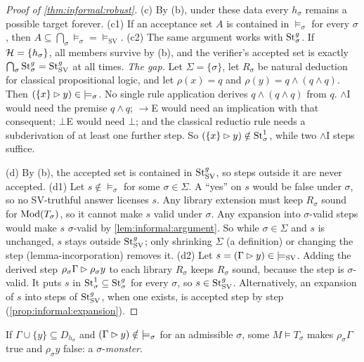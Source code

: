 \begin{proof}[Proof of \cref{thm:informal:robust}]
(c) By (b), under these data every $h_\sigma$ remains a possible target forever. (c1) If an acceptance set $A$ is contained in ${\models_\sigma}$ for every $\sigma$, then $A\subseteq\bigcap_\sigma{\models_\sigma}={\models_{\mathrm{SV}}}$. (c2) The same argument works with $\mathrm{St}^{g}_{\sigma}$. If $\mathcal{H}=\{h_\sigma\}$, all members survive by (b), and the verifier's accepted set is exactly $\bigcap_\sigma\mathrm{St}^{g}_{\sigma}=\mathrm{St}^{g}_{\mathrm{SV}}$ at all times. \emph{The gap.} Let $\Sigma=\{\sigma\}$, let $R_\sigma$ be natural deduction for classical propositional logic, and let $\rho(x)=q$ and $\rho(y)=q\wedge(q\wedge q)$. Then $(\{x\}\rhd y)\in{\models_\sigma}$. No single rule application derives $q\wedge(q\wedge q)$ from $q$. $\wedge$I would need the premise $q\wedge q$; $\to$E would need an implication with that consequent; $\bot$E would need $\bot$; and the classical reductio rule needs a subderivation of at least one further step. So $(\{x\}\rhd y)\notin\mathrm{St}^{1}_{\sigma}$, while two $\wedge$I steps suffice.

(d) By (b), the accepted set is contained in $\mathrm{St}^{g}_{\mathrm{SV}}$, so steps outside it are never accepted.
(d1) Let $s\notin{\models_\sigma}$ for some $\sigma\in\Sigma$. A ``yes'' on $s$ would be false under $\sigma$, so no SV-truthful answer licenses $s$. Any library extension must keep $R_\sigma$ sound for $\mathrm{Mod}(T_\sigma)$, so it cannot make $s$ valid under $\sigma$. Any expansion into $\sigma$-valid steps would make $s$ $\sigma$-valid by \cref{lem:informal:argument}. So while $\sigma\in\Sigma$ and $s$ is unchanged, $s$ stays outside $\mathrm{St}^{g}_{\mathrm{SV}}$; only shrinking $\Sigma$ (a definition) or changing the step (lemma-incorporation) removes it.
(d2) Let $s=(\Gamma\rhd y)\in{\models_{\mathrm{SV}}}$. Adding the derived step $\rho_\sigma\Gamma\rhd\rho_\sigma y$ to each library $R_\sigma$ keeps $R_\sigma$ sound, because the step is $\sigma$-valid. It puts $s$ in $\mathrm{St}^{1}_{\sigma}\subseteq\mathrm{St}^{g}_{\sigma}$ for every $\sigma$, so $s\in\mathrm{St}^{g}_{\mathrm{SV}}$. Alternatively, an expansion of $s$ into steps of $\mathrm{St}^{g}_{\mathrm{SV}}$, when one exists, is accepted step by step (\cref{prop:informal:expansion}).
\end{proof}

\begin{theorem}\label{thm:informal:monsters}
If $\Gamma\cup\{y\}\subseteq D_{h_\sigma}$ and $(\Gamma\rhd y)\notin{\models_\sigma}$ for an admissible $\sigma$, some $M\models T_\sigma$ makes $\rho_\sigma\Gamma$ true and $\rho_\sigma y$ false: a $\sigma$-\emph{monster}.
\end{theorem}

